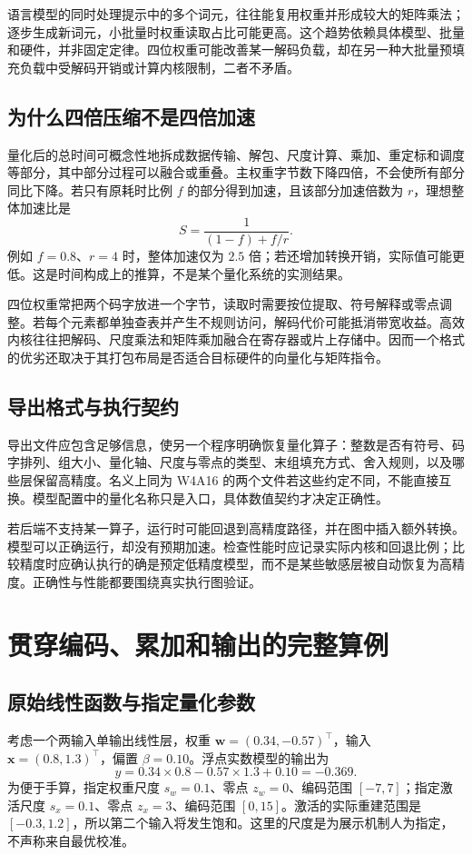 \documentclass[UTF8,12pt,a4paper,fontset=fandol]{ctexart}
\begin{document}
语言模型的同时处理提示中的多个词元，往往能复用权重并形成较大的矩阵乘法；逐步生成新词元，小批量时权重读取占比可能更高。这个趋势依赖具体模型、批量和硬件，并非固定定律。四位权重可能改善某一解码负载，却在另一种大批量预填充负载中受解码开销或计算内核限制，二者不矛盾。

\subsection{为什么四倍压缩不是四倍加速}
量化后的总时间可概念性地拆成数据传输、解包、尺度计算、乘加、重定标和调度等部分，其中部分过程可以融合或重叠。主权重字节数下降四倍，不会使所有部分同比下降。若只有原耗时比例 $f$ 的部分得到加速，且该部分加速倍数为 $r$，理想整体加速比是
\begin{equation}
 S=\frac1{(1-f)+f/r}.
 \label{eq:quant-amdahl}
\end{equation}
例如 $f=0.8$、$r=4$ 时，整体加速仅为 $2.5$ 倍；若还增加转换开销，实际值可能更低。这是时间构成上的推算，不是某个量化系统的实测结果。

四位权重常把两个码字放进一个字节，读取时需要按位提取、符号解释或零点调整。若每个元素都单独查表并产生不规则访问，解码代价可能抵消带宽收益。高效内核往往把解码、尺度乘法和矩阵乘加融合在寄存器或片上存储中。因而一个格式的优劣还取决于其打包布局是否适合目标硬件的向量化与矩阵指令。

\subsection{导出格式与执行契约}
导出文件应包含足够信息，使另一个程序明确恢复量化算子：整数是否有符号、码字排列、组大小、量化轴、尺度与零点的类型、末组填充方式、舍入规则，以及哪些层保留高精度。名义上同为 W4A16 的两个文件若这些约定不同，不能直接互换。模型配置中的量化名称只是入口，具体数值契约才决定正确性。

若后端不支持某一算子，运行时可能回退到高精度路径，并在图中插入额外转换。模型可以正确运行，却没有预期加速。检查性能时应记录实际内核和回退比例；比较精度时应确认执行的确是预定低精度模型，而不是某些敏感层被自动恢复为高精度。正确性与性能都要围绕真实执行图验证。

\section{贯穿编码、累加和输出的完整算例}
\label{sec:quant-example}

\subsection{原始线性函数与指定量化参数}
考虑一个两输入单输出线性层，权重 $\mathbf w=(0.34,-0.57)^\top$，输入 $\mathbf x=(0.8,1.3)^\top$，偏置 $\beta=0.10$。浮点实数模型的输出为
\[
 y=0.34\times0.8-0.57\times1.3+0.10=-0.369.
\]
为便于手算，指定权重尺度 $s_w=0.1$、零点 $z_w=0$、编码范围 $[-7,7]$；指定激活尺度 $s_x=0.1$、零点 $z_x=3$、编码范围 $[0,15]$。激活的实际重建范围是 $[-0.3,1.2]$，所以第二个输入将发生饱和。这里的尺度是为展示机制人为指定，不声称来自最优校准。
\end{document}
